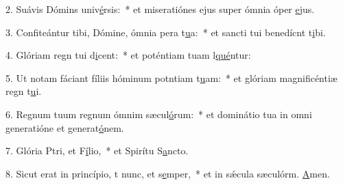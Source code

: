 2. Suávis Dómins univ\uline{é}rsis:~* et miseratiónes ejus super ómnia óper \uline{e}jus.\par 
3. Confiteántur tibi, Dómine, ómnia pera t\uline{u}a:~* et sancti tui benedícnt t\uline{i}bi.\par 
4. Glóriam regn tui d\uline{i}cent:~* et poténtiam tuam l\uline{qué}ntur:\par 
5. Ut notam fáciant fíliis hóminum potntiam t\uline{u}am:~* et glóriam magnificéntiæ regn t\uline{u}i.\par 
6. Regnum tuum regnum ómnim sæcul\uline{ó}rum:~* et dominátio tua in omni generatióne et generat\uline{ó}nem.\par 
7. Glória Ptri, et F\uline{í}lio,~* et Spirítu S\uline{a}ncto.\par 
8. Sicut erat in princípio, t nunc, et s\uline{e}mper,~* et in sǽcula sæculórm. \uline{A}men.\par 
